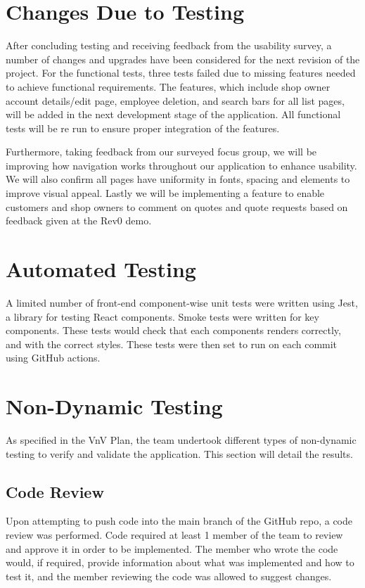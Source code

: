 \documentclass[12pt, titlepage]{article}
\begin{document}
\section{Changes Due to Testing}

After concluding testing and receiving feedback from the usability survey, a number of changes and upgrades have been considered for the next revision of the project. For the functional tests, three tests failed due to missing features needed to achieve functional requirements. The features, which include shop owner account details/edit page, employee deletion, and search bars for all list pages, will be added in the next development stage of the application. All functional tests will be re run to ensure proper integration of the features. 

Furthermore, taking feedback from our surveyed focus group, we will be improving how navigation works throughout our application to enhance usability. We will also confirm all pages have uniformity in fonts, spacing and elements to improve visual appeal. Lastly we will be implementing a feature to enable customers and shop owners to comment on quotes and quote requests based on feedback given at the Rev0 demo.

\section{Automated Testing}

A limited number of front-end component-wise unit tests were written using Jest, a library for testing React components. Smoke tests were written for key components. These tests would check that each components renders correctly, and with the correct styles. These tests were then set to run on each commit using GitHub actions.

\section{Non-Dynamic Testing}

As specified in the VnV Plan, the team undertook different types of non-dynamic testing to verify and validate the application. This section will detail the results.

\subsection{Code Review}

Upon attempting to push code into the main branch of the GitHub repo, a code review was performed. Code required at least 1 member of the team to review and approve it in order to be implemented. The member who wrote the code would, if required, provide information about what was implemented and how to test it, and the member reviewing the code was allowed to suggest changes.
\end{document}
